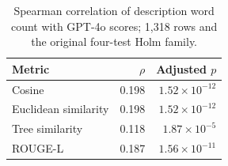 \begin{table}[H]
\centering\small
\caption{Spearman correlation of description word count with GPT-4o scores; 1,318 rows and the original four-test Holm family.}
\label{tab:correlation}
\begin{tabular}{@{}lrr@{}}
\toprule
Metric & $\rho$ & Adjusted $p$\\
\midrule
Cosine & 0.198 & $1.52\times 10^{-12}$\\
Euclidean similarity & 0.198 & $1.52\times 10^{-12}$\\
Tree similarity & 0.118 & $1.87\times 10^{-5}$\\
ROUGE-L & 0.187 & $1.56\times 10^{-11}$\\
\bottomrule
\end{tabular}
\end{table}
